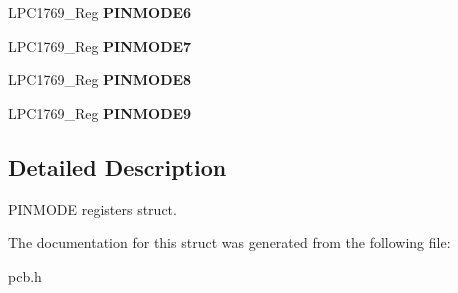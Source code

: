 \begin{DoxyCompactItemize}
\item 
\hypertarget{struct_l_p_c1769___p_i_n_m_o_d_e_a3c0efdbdfc7a3e2ccd18821289384447}{L\+P\+C1769\+\_\+\+Reg {\bfseries P\+I\+N\+M\+O\+D\+E6}}\label{struct_l_p_c1769___p_i_n_m_o_d_e_a3c0efdbdfc7a3e2ccd18821289384447}

\item 
\hypertarget{struct_l_p_c1769___p_i_n_m_o_d_e_a3d00d84a84a3b9928b1f452301ced424}{L\+P\+C1769\+\_\+\+Reg {\bfseries P\+I\+N\+M\+O\+D\+E7}}\label{struct_l_p_c1769___p_i_n_m_o_d_e_a3d00d84a84a3b9928b1f452301ced424}

\item 
\hypertarget{struct_l_p_c1769___p_i_n_m_o_d_e_a4fb7909c18148c7139955d904383a9b8}{L\+P\+C1769\+\_\+\+Reg {\bfseries P\+I\+N\+M\+O\+D\+E8}}\label{struct_l_p_c1769___p_i_n_m_o_d_e_a4fb7909c18148c7139955d904383a9b8}

\item 
\hypertarget{struct_l_p_c1769___p_i_n_m_o_d_e_a0095de3723dcd192d6261f26d17c2fbe}{L\+P\+C1769\+\_\+\+Reg {\bfseries P\+I\+N\+M\+O\+D\+E9}}\label{struct_l_p_c1769___p_i_n_m_o_d_e_a0095de3723dcd192d6261f26d17c2fbe}

\end{DoxyCompactItemize}


\subsection{Detailed Description}
P\+I\+N\+M\+O\+D\+E registers struct. 

The documentation for this struct was generated from the following file\+:\begin{DoxyCompactItemize}
\item 
pcb.\+h\end{DoxyCompactItemize}
